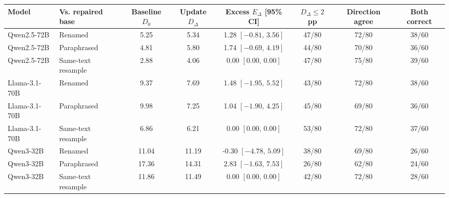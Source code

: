 \begin{tabular}{@{}llcccccc@{}}
\toprule
Model & Vs. repaired base & Baseline $D_0$ & Update $D_\Delta$ & Excess $E_\Delta$ [95\% CI] & $D_\Delta\leq2$ pp & Direction agree & Both correct \\
\midrule
Qwen2.5-72B & Renamed & 5.25 & 5.34 & 1.28 $[-0.81,\,3.56]$ & 47/80 & 72/80 & 38/60 \\
Qwen2.5-72B & Paraphrased & 4.81 & 5.80 & 1.74 $[-0.69,\,4.19]$ & 44/80 & 70/80 & 36/60 \\
Qwen2.5-72B & Same-text resample & 2.88 & 4.06 & 0.00 $[0.00,\,0.00]$ & 47/80 & 75/80 & 39/60 \\
Llama-3.1-70B & Renamed & 9.37 & 7.69 & 1.48 $[-1.95,\,5.52]$ & 43/80 & 72/80 & 38/60 \\
Llama-3.1-70B & Paraphrased & 9.98 & 7.25 & 1.04 $[-1.90,\,4.25]$ & 45/80 & 69/80 & 36/60 \\
Llama-3.1-70B & Same-text resample & 6.86 & 6.21 & 0.00 $[0.00,\,0.00]$ & 53/80 & 72/80 & 37/60 \\
Qwen3-32B & Renamed & 11.04 & 11.19 & -0.30 $[-4.78,\,5.09]$ & 38/80 & 69/80 & 26/60 \\
Qwen3-32B & Paraphrased & 17.36 & 14.31 & 2.83 $[-1.63,\,7.53]$ & 26/80 & 62/80 & 24/60 \\
Qwen3-32B & Same-text resample & 11.86 & 11.49 & 0.00 $[0.00,\,0.00]$ & 42/80 & 72/80 & 28/60 \\
\bottomrule
\end{tabular}
